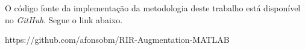 O código fonte da implementação da metodologia deste trabalho está disponível no \textit{GitHub}.
Segue o link abaixo.

https://github.com/afonsobm/RIR-Augmentation-MATLAB
